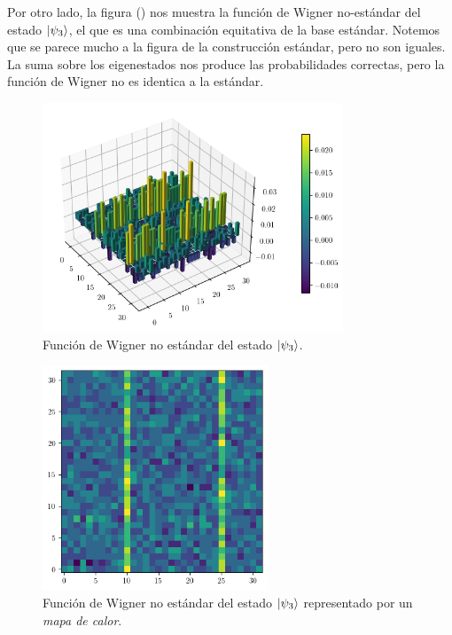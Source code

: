 \documentclass[a4paper]{report}
\begin{document}
  Por otro lado, la figura () nos muestra la función de
  Wigner no-estándar del estado
  $\ket{\psi_3}$, el que es una combinación equitativa de la
  base estándar. Notemos que se parece mucho a la figura de
  la construcción estándar, pero no son iguales. La suma
  sobre los eigenestados nos produce las probabilidades
  correctas, pero la función de Wigner no es identica a la
  estándar.

  \begin{figure}[ht]
    \centering
    \includegraphics[width=0.8\textwidth]{imgs/wigner-kantor-2-5-s2.png}
    \caption{Función de Wigner no estándar del estado $\ket{\psi_3}$.}
    \label{fig:wigner-kantor-2-5-s2}
  \end{figure}
  \begin{figure}[ht]
    \centering
    \includegraphics[width=0.6\textwidth]{imgs/wigner-kantor-2-5-s2-heat.png}
    \caption{Función de Wigner no estándar del estado
    $\ket{\psi_3}$ representado por un \textit{mapa de
    calor}.}
    \label{fig:wigner-kantor-2-5-s2-heat}
  \end{figure}
\end{document}
